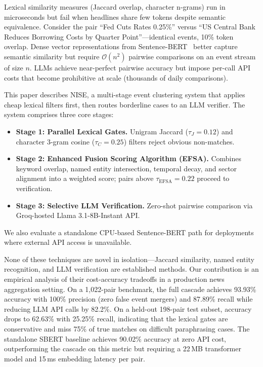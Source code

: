\documentclass[conference]{IEEEtran}
\begin{document}
Lexical similarity measures (Jaccard overlap, character n-grams) run in microseconds but fail when headlines share few tokens despite semantic equivalence.
Consider the pair ``Fed Cuts Rates 0.25\%'' versus ``US Central Bank Reduces Borrowing Costs by Quarter Point''---identical events, 10\% token overlap.
Dense vector representations from Sentence-BERT~\cite{reimers2019sentence} better capture semantic similarity but require $\mathcal{O}(n^2)$ pairwise comparisons on an event stream of size $n$.
LLMs achieve near-perfect pairwise accuracy but impose per-call API costs that become prohibitive at scale (thousands of daily comparisons).

This paper describes NISE, a multi-stage event clustering system that applies cheap lexical filters first, then routes borderline cases to an LLM verifier.
The system comprises three core stages:
\begin{itemize}
    \item \textbf{Stage 1: Parallel Lexical Gates.} Unigram Jaccard ($\tau_J = 0.12$) and character 3-gram cosine ($\tau_C = 0.25$) filters reject obvious non-matches.
    \item \textbf{Stage 2: Enhanced Fusion Scoring Algorithm (EFSA).} Combines keyword overlap, named entity intersection, temporal decay, and sector alignment into a weighted score; pairs above $\tau_{\text{EFSA}} = 0.22$ proceed to verification.
    \item \textbf{Stage 3: Selective LLM Verification.} Zero-shot pairwise comparison via Groq-hosted Llama 3.1-8B-Instant API.
\end{itemize}

We also evaluate a standalone CPU-based Sentence-BERT path for deployments where external API access is unavailable.

None of these techniques are novel in isolation---Jaccard similarity, named entity recognition, and LLM verification are established methods.
Our contribution is an empirical analysis of their cost-accuracy tradeoffs in a production news aggregation setting.
On a 1,022-pair benchmark, the full cascade achieves 93.93\% accuracy with 100\% precision (zero false event mergers) and 87.89\% recall while reducing LLM API calls by 82.2\%.
On a held-out 198-pair test subset, accuracy drops to 62.63\% with 25.25\% recall, indicating that the lexical gates are conservative and miss 75\% of true matches on difficult paraphrasing cases.
The standalone SBERT baseline achieves 90.02\% accuracy at zero API cost, outperforming the cascade on this metric but requiring a 22\,MB transformer model and 15\,ms embedding latency per pair.
\end{document}
